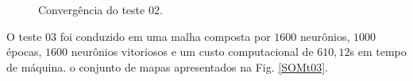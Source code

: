 \begin{figure}[H]
	\centering
	\setlength{\fboxsep}{8pt}
	\setlength{\fboxrule}{0.1pt}
	\caption{Convergência do teste $02$.}
	\label{Conv02}
\end{figure} 

O teste $03$ foi conduzido em uma malha composta por $1600$ neurônios, $1000$ épocas, $1600$ neurônios vitoriosos e um custo computacional de $610,12$s em tempo de máquina. o conjunto de mapas apresentados na Fig. \ref{SOMt03}.

